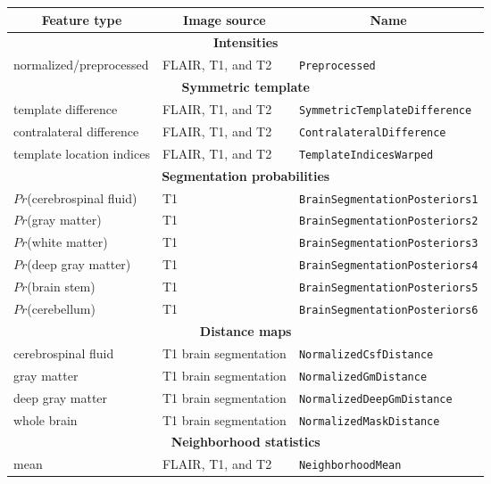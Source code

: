 \begin{table}[!htb]
  \centering
  \begin{tabular*}{0.85\textwidth}{@{\extracolsep{\fill}} lll}
    \multicolumn{1}{c}{\textbf{Feature type}} & \multicolumn{1}{c}{\textbf{Image source}} & \multicolumn{1}{c}{\textbf{Name}} \\
    \toprule
    \midrule
    \multicolumn{3}{c}{\textbf{Intensities}} \\
    \midrule
    normalized/preprocessed & FLAIR, T1, and T2 & \texttt{Preprocessed} \\
    \midrule
    \multicolumn{3}{c}{\textbf{Symmetric template}} \\
    \midrule
    template difference & FLAIR, T1, and T2 & \texttt{SymmetricTemplateDifference}\\
    contralateral difference & FLAIR, T1, and T2 & \texttt{ContralateralDifference}\\
    template location indices & FLAIR, T1, and T2 & \texttt{TemplateIndicesWarped}\\
    \midrule
    \multicolumn{3}{c}{\textbf{Segmentation probabilities}} \\
    \midrule
    $Pr$(cerebrospinal fluid) & T1 & \texttt{BrainSegmentationPosteriors1}\\
    $Pr$(gray matter) & T1 & \texttt{BrainSegmentationPosteriors2}\\
    $Pr$(white matter) & T1 & \texttt{BrainSegmentationPosteriors3}\\
    $Pr$(deep gray matter) & T1 & \texttt{BrainSegmentationPosteriors4}\\
    $Pr$(brain stem) & T1 & \texttt{BrainSegmentationPosteriors5}\\
    $Pr$(cerebellum) & T1 & \texttt{BrainSegmentationPosteriors6}\\
    \midrule
    \multicolumn{3}{c}{\textbf{Distance maps}} \\
    \midrule
    cerebrospinal fluid & T1 brain segmentation & \texttt{NormalizedCsfDistance}\\
    gray matter & T1 brain segmentation & \texttt{NormalizedGmDistance}\\
    deep gray matter & T1 brain segmentation & \texttt{NormalizedDeepGmDistance}\\
    whole brain & T1 brain segmentation & \texttt{NormalizedMaskDistance}\\
    \midrule
    \multicolumn{3}{c}{\textbf{Neighborhood statistics}} \\
    \midrule
    mean & FLAIR, T1, and T2 & \texttt{NeighborhoodMean}\\

\end{tabular*}
\end{table}
